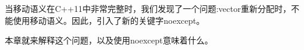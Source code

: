 当移动语义在C++11中非常完整时，我们发现了一个问题:vector重新分配时，不能使用移动语义。因此，引入了新的关键字noexcept。\par

本章就来解释这个问题，以及使用noexcept意味着什么。\par